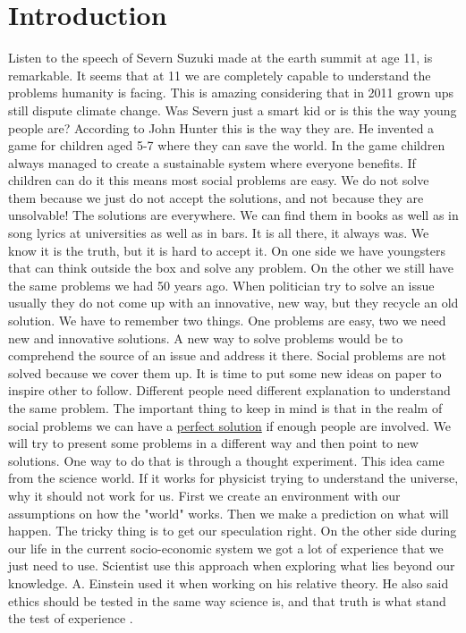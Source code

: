 \documentclass{article}
\begin{document}
\section{Introduction}
\label{sec:intro}
Listen to the speech of Severn Suzuki \cite{severn} made at the earth summit at age 11, is remarkable.
It seems that at 11 we are completely capable to understand the problems humanity is facing.
This is amazing considering that in 2011 grown ups still dispute climate change.
Was Severn just a smart kid or is this the way young people are?
According to John Hunter \cite{peace_game} this is the way they are.
He invented a game for children aged 5-7 where they can save the world.
In the game children always managed to create a sustainable system where everyone benefits.
If children can do it this means most social problems are easy.
We do not solve them because we just do not accept the solutions, and not because they are unsolvable!
The solutions are everywhere.
We can find them in books as well as in song lyrics at universities as well as in bars.
It is all there, it always was.
We know it is the truth, but it is hard to accept it.
On one side we have youngsters that can think outside the box and solve any problem.
On the other we still have the same problems we had 50 years ago.
When politician try to solve an issue usually they do not come up with an innovative, new way, but they recycle an old solution.
We have to remember two things.
One problems are easy, two we need new and innovative solutions.
A new way to solve problems would be to comprehend the source of an issue and address it there.
Social problems are not solved because we cover them up.
It is time to put some new ideas on paper to inspire other to follow.
Different people need different explanation to understand the same problem.
The important thing to keep in mind is that in the realm of social problems we can have a \underline{perfect solution} if enough people are involved.
We will try to present some problems in a different way and then point to new solutions.
One way to do that is through a thought experiment.
This idea came from the science world.
If it works for physicist trying to understand the universe, why it should not work for us.
First we create an environment with our assumptions on how the "world" works.
Then we make a prediction on what will happen.
The tricky thing is to get our speculation right.
On the other side during our life in the current socio-economic system we got a lot of experience that we just need to use.
Scientist use this approach when exploring what lies beyond our knowledge.
A. Einstein used it when working on his relative theory.
He also said ethics should be tested in the same way science is, and that truth is what stand the test of experience \cite{einstein}.
\end{document}
